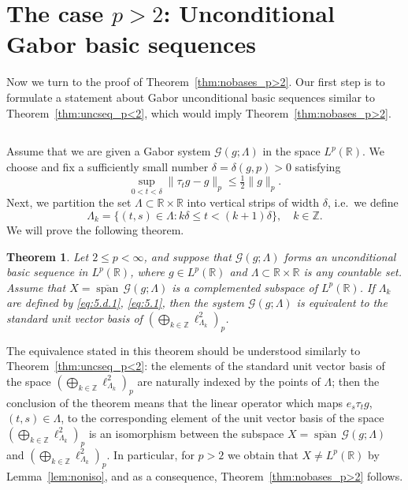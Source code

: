 \documentclass[reqno,a4paper,12pt]{amsart}
\numberwithin{equation}{section}
\numberwithin{figure}{section}
\newcommand\R{\mathbb{R}}
\newcommand\Z{\mathbb{Z}}
\newcommand\G{\mathcal{G}}
\newcommand\1{\mathds{1}}
\newcommand{\ts}{\tau}
\renewcommand\le{\leqslant}
\newcommand\sbt{\subset}
\newcommand{\cspan}{\overline{\operatorname{span}}}
\theoremstyle{plain}
\newtheorem{thm}{Theorem}[section]
\newcommand{\thmref}[1]{Theorem~\ref{#1}}
\newcommand{\lemref}[1]{Lemma~\ref{#1}}
\theoremstyle{definition}
\begin{document}
\section{The case $p > 2$: Unconditional Gabor basic sequences}
\label{sec:basesp>2}

Now we turn to the proof of \thmref{thm:nobases_p>2}. Our first step is to formulate a statement about Gabor unconditional basic sequences similar to \thmref{thm:uncseq_p<2}, which would imply \thmref{thm:nobases_p>2}.

\subsection{}
Assume that we are given a Gabor system $\G(g; \Lambda)$ in the space $L^p(\R)$. We choose and fix a sufficiently small number $\delta = \delta(g,p) > 0$ satisfying 
\begin{equation}
\label{eq:5.d.1}
\sup_{0 < t < \delta}
\|\tau_t g - g\|_p \le \tfrac{1}{2} \|g\|_p.
\end{equation}
Next, we partition the set $\Lambda \sbt \R \times \R$
into vertical strips of width $\delta$, i.e.\ we define
\begin{equation}
\label{eq:5.1}
\Lambda_k = \{(t,s)\in \Lambda:  k\delta \le t < (k+1)\delta \}, \quad k \in \Z.
\end{equation}
We will  prove the following theorem.

\begin{thm}
\label{thm:uncseq_p>2}
Let $2 \le p < \infty$, and suppose that $\G(g; \Lambda)$ forms an unconditional basic sequence in $L^p(\R)$, where $g\in L^p(\R)$ and  $\Lambda \sbt \R \times \R$ is any countable set. Assume that $X = \cspan \, \G(g; \Lambda)$ is a complemented subspace of $L^p(\R)$. If  $\Lambda_k$ are defined by \eqref{eq:5.d.1}, \eqref{eq:5.1}, then the system $\G(g; \Lambda)$ is equivalent to the standard unit vector basis of $(\bigoplus_{k\in\Z} \ell^2_{\Lambda_k})_p$.
\end{thm}

The equivalence stated in this theorem should be understood similarly to \thmref{thm:uncseq_p<2}: the elements of the standard unit vector basis of the space $(\bigoplus_{k\in\Z} \ell^2_{\Lambda_k})_p$ are naturally indexed by the points of $\Lambda$; then the conclusion of the theorem means that the  linear operator which maps $e_s \ts_t g$, $(t,s)\in \Lambda$, to the corresponding element of the unit vector basis of the space $(\bigoplus_{k\in\Z} \ell^2_{\Lambda_k})_p$ is an isomorphism between the subspace $X = \cspan \,  \G(g;\Lambda)$ and $(\bigoplus_{k\in\Z} \ell^2_{\Lambda_k})_p$. In particular, for $p > 2$ we obtain that $X \neq L^p(\R)$ by \lemref{lem:noniso}, and as a consequence, \thmref{thm:nobases_p>2} follows.
\end{document}
